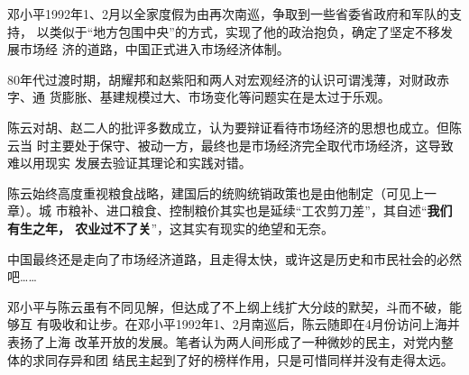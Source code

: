 邓小平1992年1、2月以全家度假为由再次南巡，争取到一些省委省政府和军队的支持，
以类似于“地方包围中央”的方式，实现了他的政治抱负，确定了坚定不移发展市场经
济的道路，中国正式进入市场经济体制。

80年代过渡时期，胡耀邦和赵紫阳和两人对宏观经济的认识可谓浅薄，对财政赤字、通
货膨胀、基建规模过大、市场变化等问题实在是太过于乐观。

陈云对胡、赵二人的批评多数成立，认为要辩证看待市场经济的思想也成立。但陈云当
时主要处于保守、被动一方，最终也是市场经济完全取代市场经济，这导致难以用现实
发展去验证其理论和实践对错。

陈云始终高度重视粮食战略，建国后的统购统销政策也是由他制定（可见上一章）。城
市粮补、进口粮食、控制粮价其实也是延续“工农剪刀差”，其自述“\textbf{我们有生之年，
  农业过不了关}”，这其实有现实的绝望和无奈。

中国最终还是走向了市场经济道路，且走得太快，或许这是历史和市民社会的必然吧……



邓小平与陈云虽有不同见解，但达成了不上纲上线扩大分歧的默契，斗而不破，能够互
有吸收和让步。在邓小平1992年1、2月南巡后，陈云随即在4月份访问上海并表扬了上海
改革开放的发展。笔者认为两人间形成了一种微妙的民主，对党内整体的求同存异和团
结民主起到了好的榜样作用，只是可惜同样并没有走得太远。





